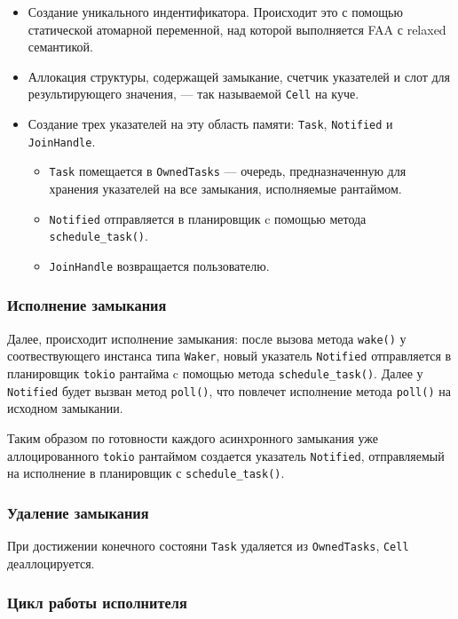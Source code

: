 \begin{itemize}
    \item Создание уникального индентификатора. Происходит это с помощью статической атомарной переменной, над которой выполняется FAA с relaxed семантикой.
    \item Аллокация структуры, содержащей замыкание, счетчик указателей и слот для результирующего значения, --- так называемой \verb|Cell| на куче.
    \item Создание трех указателей на эту область памяти: \verb|Task|, \verb|Notified| и \verb|JoinHandle|.
    \begin{itemize}
        \item \verb|Task| помещается в \verb|OwnedTasks| --- очередь, предназначенную для хранения указателей на все замыкания, исполняемые рантаймом.
        \item \verb|Notified| отправляется в планировщик c помощью метода \verb|schedule_task()|.
        \item \verb|JoinHandle| возвращается пользователю.
    \end{itemize}
\end{itemize}

\subsubsection{Исполнение замыкания}

Далее, происходит исполнение замыкания: после вызова метода \verb|wake()| у соотвествующего инстанса типа \verb|Waker|, новый указатель \verb|Notified| отправляется в планировщик \verb|tokio| рантайма c помощью метода \verb|schedule_task()|. Далее у \verb|Notified| будет вызван метод \verb|poll()|, что повлечет исполнение метода \verb|poll()| на исходном замыкании.

Таким образом по готовности каждого асинхронного замыкания уже аллоцированного \verb|tokio| рантаймом создается указатель \verb|Notified|, отправляемый на исполнение в планировщик с \verb|schedule_task()|.

\subsubsection{Удаление замыкания}

При достижении конечного состояни \verb|Task| удаляется из \verb|OwnedTasks|, \verb|Cell| деаллоцируется.

\subsubsection{Цикл работы исполнителя}

